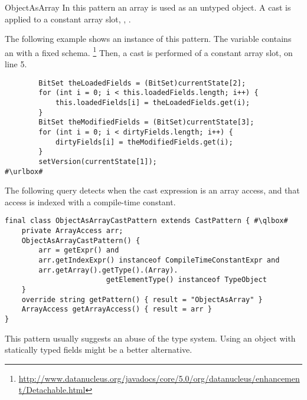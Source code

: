 \begin{pattern}{ObjectAsArray}
In this pattern an array is used as an untyped object.
A cast is applied to a constant array slot, \eg, .

\instances{}
The following example shows an instance of this pattern.
The variable  contains an  with a fixed schema.%
\footnote{\url{http://www.datanucleus.org/javadocs/core/5.0/org/datanucleus/enhancement/Detachable.html}}
Then, a cast is performed of a constant array slot,
 on line 5.

\def\urlvar{http://bit.ly/datanucleus_datanucleus_core_2S1L5Zf}
\begin{verbatim}
        BitSet theLoadedFields = (BitSet)currentState[2];
        for (int i = 0; i < this.loadedFields.length; i++) {
            this.loadedFields[i] = theLoadedFields.get(i);
        }
        BitSet theModifiedFields = (BitSet)currentState[3];
        for (int i = 0; i < dirtyFields.length; i++) {
            dirtyFields[i] = theModifiedFields.get(i);
        }
        setVersion(currentState[1]);
#\urlbox#
\end{verbatim}


\detection{}
The following query detects when the cast expression is an array access,
and that access is indexed with a compile-time constant.

\begin{listing}
\begin{verbatim}
final class ObjectAsArrayCastPattern extends CastPattern { #\qlbox#
    private ArrayAccess arr;
    ObjectAsArrayCastPattern() {
        arr = getExpr() and
        arr.getIndexExpr() instanceof CompileTimeConstantExpr and
        arr.getArray().getType().(Array).
                        getElementType() instanceof TypeObject
    }
    override string getPattern() { result = "ObjectAsArray" }
    ArrayAccess getArrayAccess() { result = arr }
}
\end{verbatim}
\end{listing}

\issues{}
This pattern usually suggests an abuse of the type system.
Using an object with statically typed fields might be a better alternative.

\end{pattern}
